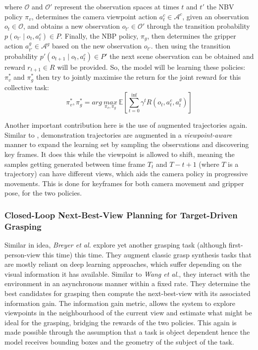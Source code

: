 where $\mathcal{O}$ and $\mathcal{O}'$ represent the observation spaces at times $t$ and $t'$ the NBV policy $\pi_v$, determines the camera viewpoint action $a_t^c \in \mathcal{A}^c$, given an observation $o_t \in \mathcal{O}$, and obtains a new observation $o_{t'} \in \mathcal{O}'$ through the transition probability $p\left(o_{t'} \mid o_t, a_t^c\right) \in P$. Finally, the NBP policy, $\pi_g$, then determines the gripper action $a^g_{t'} \in \mathcal{A}^g$ based on the new observation $o_{t'}$. then using the transition probability $p'\left(o_{t+1} \mid o_t, a^c_t\right) \in P'$ the next scene observation can be obtained and reward $r_{t+1} \in R$ will be provided. So, the model will be learning these policies: $\pi^*_v$ and $\pi^*_g$ then try to jointly maximise the return for the joint reward for this collective task: 
\[
  \pi_v^*, \pi_g^* = 
  arg~\underset{\pi_v, \pi_g}{max} 
  ~\mathbb{E}
  \left[
    \sum_{t=0}^{\inf}{\gamma^t R(o_t, a^c_t, a^g_t)}
  \right]
\]

Another important contribution here is the use of augmented trajectories again. Similar to \cite{papagiannis2024milesmakingimitationlearning}, demonstration trajectories are augmented in a \emph{viewpoint-aware} manner to expand the learning set by sampling the observations and discovering key frames. It does this while the viewpoint is allowed to shift, meaning the samples getting generated between time frame $T_t$ and $T-{t+1}$ (where $T$ is a trajectory) can have different views, which aids the camera policy in progressive movements. This is done for keyframes for both camera movement and gripper pose, for the two policies.

\subsubsection{Closed-Loop Next-Best-View Planning for Target-Driven Grasping}
Similar in idea, \emph{Breyer et al.} explore yet another grasping task \cite{breyer2022closedloopnextbestviewplanningtargetdriven} (although first-person-view this time) this time. They augment classic grasp synthesis tasks that are mostly reliant on deep learning approaches, which suffer depending on the visual information it has available. Similar to \emph{Wang et al.}, they interact with the environment in an asynchronous manner within a fixed rate. They determine the best candidates for grasping then compute the next-best-view with its associated information gain. 
The information gain metric, allows the system to explore viewpoints in the neighbourhood of the current view and estimate what might be ideal for the grasping, bridging the rewards of the two policies. This again is made possible through the assumption that a task is object dependent hence the model receives bounding boxes and the geometry of the subject of the task.

